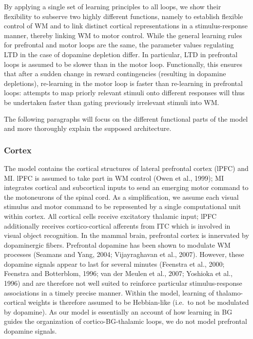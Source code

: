 \documentclass[
  11pt,
  a4paper,
]{scrbook}
\begin{document}
By applying a single set of learning principles to all loops, we show
their flexibility to subserve two highly different functions, namely to
establish flexible control of WM and to link distinct cortical
representations in a stimulus-response manner, thereby linking WM to
motor control. While the general learning rules for prefrontal and motor
loops are the same, the parameter values regulating LTD in the case of
dopamine depletion differ. In particular, LTD in prefrontal loops is
assumed to be slower than in the motor loop. Functionally, this ensures
that after a sudden change in reward contingencies (resulting in
dopamine depletions), re-learning in the motor loop is faster than
re-learning in prefrontal loops: attempts to map priorly relevant
stimuli onto different responses will thus be undertaken faster than
gating previously irrelevant stimuli into WM.

The following paragraphs will focus on the different functional parts of
the model and more thoroughly explain the supposed architecture.

\subsubsection*{Cortex}\label{cortex}

The model contains the cortical structures of lateral prefrontal cortex
(lPFC) and MI. lPFC is assumed to take part in WM control (Owen et al.,
1999); MI integrates cortical and subcortical inputs to send an emerging
motor command to the motoneurons of the spinal cord. As a
simplification, we assume each visual stimulus and motor command to be
represented by a single computational unit within cortex. All cortical
cells receive excitatory thalamic input; lPFC additionally receives
cortico-cortical afferents from ITC which is involved in visual object
recognition. In the mammal brain, prefrontal cortex is innervated by
dopaminergic fibers. Prefrontal dopamine has been shown to modulate WM
processes (Seamans and Yang, 2004; Vijayraghavan et al., 2007). However,
these dopamine signals appear to last for several minutes (Feenstra et
al., 2000; Feenstra and Botterblom, 1996; van der Meulen et al., 2007;
Yoshioka et al., 1996) and are therefore not well suited to reinforce
particular stimulus-response associations in a timely precise manner.
Within the model, learning of thalamo-cortical weights is therefore
assumed to be Hebbian-like (i.e.~to not be modulated by dopamine). As
our model is essentially an account of how learning in BG guides the
organization of cortico-BG-thalamic loops, we do not model prefrontal
dopamine signals.
\end{document}
